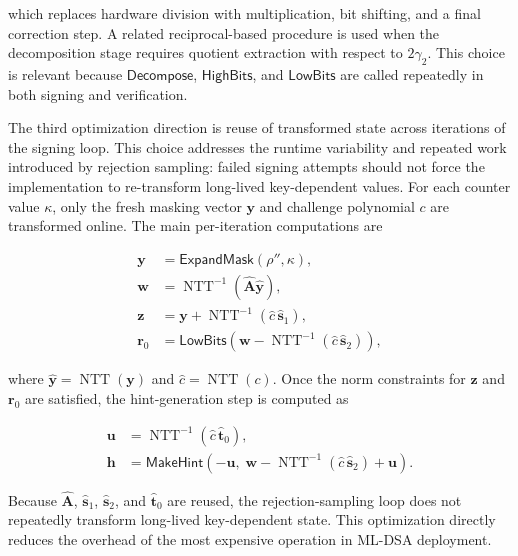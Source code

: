 \documentclass[final, twoside]{IEEEtran} %
\begin{document}
which replaces hardware division with multiplication, bit shifting, and a final correction step. A related reciprocal-based procedure is used when the decomposition stage requires quotient extraction with respect to $2\gamma_2$. This choice is relevant because $\mathsf{Decompose}$, $\mathsf{HighBits}$, and $\mathsf{LowBits}$ are called repeatedly in both signing and verification.

The third optimization direction is reuse of transformed state across iterations of the signing loop. This choice addresses the runtime variability and repeated work introduced by rejection sampling: failed signing attempts should not force the implementation to re-transform long-lived key-dependent values. For each counter value $\kappa$, only the fresh masking vector $\mathbf{y}$ and challenge polynomial $c$ are transformed online. The main per-iteration computations are

\begin{align}
\mathbf{y} &= \mathsf{ExpandMask}(\rho'',\kappa), \\
\mathbf{w} &= \operatorname{NTT}^{-1}\!\left(\hat{\mathbf{A}}\hat{\mathbf{y}}\right), \\
\mathbf{z} &= \mathbf{y} + \operatorname{NTT}^{-1}\!\left(\hat{c}\,\hat{\mathbf{s}}_1\right), \\
\mathbf{r}_0 &= \mathsf{LowBits}\!\left(\mathbf{w} - \operatorname{NTT}^{-1}\!\left(\hat{c}\,\hat{\mathbf{s}}_2\right)\right),
\label{eq:sign-core}
\end{align}

where $\hat{\mathbf{y}} = \operatorname{NTT}(\mathbf{y})$ and $\hat{c} = \operatorname{NTT}(c)$. Once the norm constraints for $\mathbf{z}$ and $\mathbf{r}_0$ are satisfied, the hint-generation step is computed as

\begin{align}
\mathbf{u} &= \operatorname{NTT}^{-1}\!\left(\hat{c}\,\hat{\mathbf{t}}_0\right), \\
\mathbf{h} &= \mathsf{MakeHint}\!\left(-\mathbf{u},\; \mathbf{w} - \operatorname{NTT}^{-1}\!\left(\hat{c}\,\hat{\mathbf{s}}_2\right) + \mathbf{u}\right).
\label{eq:hint-step}
\end{align}

Because $\hat{\mathbf{A}}$, $\hat{\mathbf{s}}_1$, $\hat{\mathbf{s}}_2$, and $\hat{\mathbf{t}}_0$ are reused, the rejection-sampling loop does not repeatedly transform long-lived key-dependent state. This optimization directly reduces the overhead of the most expensive operation in ML-DSA deployment.
\end{document}
